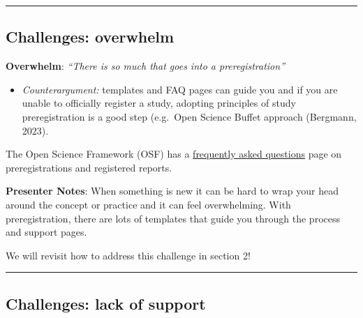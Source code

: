 \documentclass[
  letterpaper,
  DIV=11,
  numbers=noendperiod]{scrartcl}
\providecommand{\tightlist}{%
  \setlength{\itemsep}{0pt}\setlength{\parskip}{0pt}}
\begin{document}
\begin{center}\rule{0.5\linewidth}{0.5pt}\end{center}

\subsection{Challenges: overwhelm}\label{challenges-overwhelm}

\textbf{Overwhelm}: \emph{``There is so much that goes into a
preregistration''}

\begin{itemize}
\tightlist
\item
  \emph{Counterargument:} templates and FAQ pages can guide you and if
  you are unable to officially register a study, adopting principles of
  study preregistration is a good step (e.g.~Open Science Buffet
  approach (Bergmann, 2023).
\end{itemize}

\begin{tcolorbox}[enhanced jigsaw, arc=.35mm, bottomrule=.15mm, bottomtitle=1mm, breakable, colback=white, colbacktitle=quarto-callout-note-color!10!white, colframe=quarto-callout-note-color-frame, coltitle=black, left=2mm, leftrule=.75mm, opacityback=0, opacitybacktitle=0.6, rightrule=.15mm, title=\textcolor{quarto-callout-note-color}{\faInfo}\hspace{0.5em}{Find out more}, titlerule=0mm, toprule=.15mm, toptitle=1mm]

The Open Science Framework (OSF) has a
\href{https://help.osf.io/article/330-welcome-to-registrations\#FAQs-GG_d_}{frequently
asked questions} page on preregistrations and registered reports.

\end{tcolorbox}

\textbf{Presenter Notes}: When something is new it can be hard to wrap
your head around the concept or practice and it can feel overwhelming.
With preregistration, there are lots of templates that guide you through
the process and support pages.

We will revisit how to address this challenge in section 2!

\begin{center}\rule{0.5\linewidth}{0.5pt}\end{center}

\subsection{Challenges: lack of
support}\label{challenges-lack-of-support}
\end{document}
